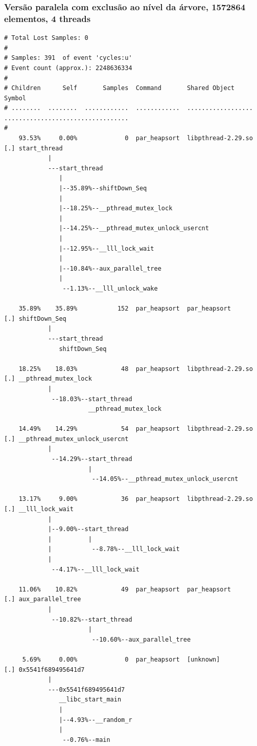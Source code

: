 \documentclass{article}
\begin{document}
\subsubsection{Versão paralela com exclusão ao nível da árvore, 1572864 elementos, 4 threads}
\scriptsize
\begin{verbatim}
# Total Lost Samples: 0
#
# Samples: 391  of event 'cycles:u'
# Event count (approx.): 2248636334
#
# Children      Self       Samples  Command       Shared Object       Symbol
# ........  ........  ............  ............  ..................  ..................................
#
    93.53%     0.00%             0  par_heapsort  libpthread-2.29.so  [.] start_thread
            |
            ---start_thread
               |
               |--35.89%--shiftDown_Seq
               |
               |--18.25%--__pthread_mutex_lock
               |
               |--14.25%--__pthread_mutex_unlock_usercnt
               |
               |--12.95%--__lll_lock_wait
               |
               |--10.84%--aux_parallel_tree
               |
                --1.13%--__lll_unlock_wake

    35.89%    35.89%           152  par_heapsort  par_heapsort        [.] shiftDown_Seq
            |
            ---start_thread
               shiftDown_Seq

    18.25%    18.03%            48  par_heapsort  libpthread-2.29.so  [.] __pthread_mutex_lock
            |
             --18.03%--start_thread
                       __pthread_mutex_lock

    14.49%    14.29%            54  par_heapsort  libpthread-2.29.so  [.] __pthread_mutex_unlock_usercnt
            |
             --14.29%--start_thread
                       |
                        --14.05%--__pthread_mutex_unlock_usercnt

    13.17%     9.00%            36  par_heapsort  libpthread-2.29.so  [.] __lll_lock_wait
            |
            |--9.00%--start_thread
            |          |
            |           --8.78%--__lll_lock_wait
            |
             --4.17%--__lll_lock_wait

    11.06%    10.82%            49  par_heapsort  par_heapsort        [.] aux_parallel_tree
            |
             --10.82%--start_thread
                       |
                        --10.60%--aux_parallel_tree

     5.69%     0.00%             0  par_heapsort  [unknown]           [.] 0x5541f689495641d7
            |
            ---0x5541f689495641d7
               __libc_start_main
               |
               |--4.93%--__random_r
               |
                --0.76%--main


\end{verbatim}
\end{document}
